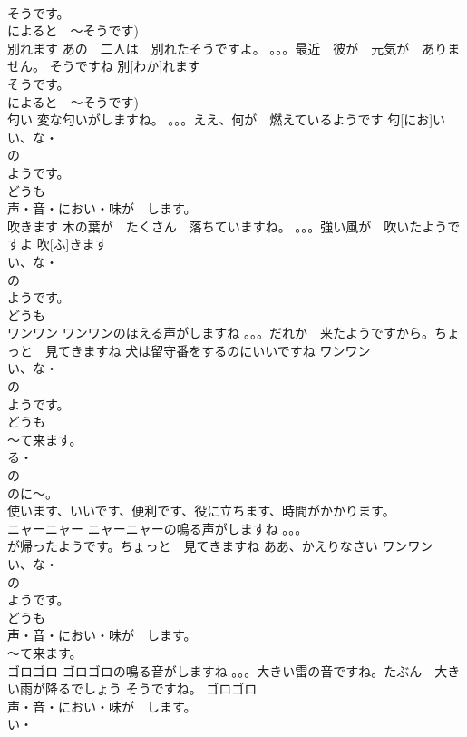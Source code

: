 \documentclass[8pt]{extreport}
\begin{document}
\begin{CJK}{UTF8}{min}
\\	そうです。
\\	によると　～そうです)	
\\	別れます	あの　二人は　別れたそうですよ。 。。。最近　彼が　元気が　ありません。 そうですね	別[わか]れます			
\\	そうです。
\\	によると　～そうです)	
\\	匂い	変な匂いがしますね。 。。。ええ、何が　燃えているようです	匂[にお]い			
\\	い、な・
\\	の
\\	ようです。
\\	どうも
\\	声・音・におい・味が　します。
\\	吹きます	木の葉が　たくさん　落ちていますね。 。。。強い風が　吹いたようですよ	吹[ふ]きます			
\\	い、な・
\\	の
\\	ようです。
\\	どうも
\\	ワンワン	ワンワンのほえる声がしますね 。。。だれか　来たようですから。ちょっと　見てきますね 犬は留守番をするのにいいですね	ワンワン				
\\	い、な・
\\	の
\\	ようです。
\\	どうも
\\	～て来ます。
\\	る・
\\	の　
\\	のに～。
\\	使います、いいです、便利です、役に立ちます、時間がかかります。	
\\	ニャーニャー	ニャーニャーの鳴る声がしますね 。。。
\\	が帰ったようです。ちょっと　見てきますね ああ、かえりなさい	ワンワン			
\\	い、な・
\\	の
\\	ようです。
\\	どうも
\\	声・音・におい・味が　します。
\\	～て来ます。
\\	ゴロゴロ	ゴロゴロの鳴る音がしますね 。。。大きい雷の音ですね。たぶん　大きい雨が降るでしょう そうですね。	ゴロゴロ			
\\	声・音・におい・味が　します。
\\	い・

\end{CJK}
\end{document}
